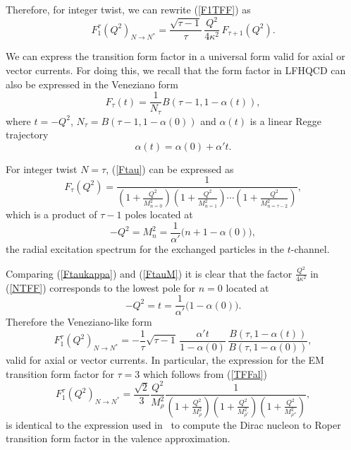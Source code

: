 \documentclass[12pt]{article}
\newcommand{\beq}{\begin{equation}}
\newcommand{\enq}{\end{equation}}
\newcommand{\req}[1]{(\ref{#1})}
\newcommand{\al}{\alpha}
\newcommand{\ka}{\kappa}
\newcommand{\ta}{\tau}
\begin{document}
Therefore, for integer twist, we can rewrite \req{F1TFF} as
\beq \label{NTFF}
F_1^\tau(Q^2)_{N \to N^*}  = \frac{\sqrt{\ta -1}}{\ta} \, \frac{Q^2}{4 \ka^2} \, F_{\ta+1}(Q^2).
\enq



We can express the transition form factor in a universal form valid for axial or vector currents. For doing this, we recall that the form factor in LFHQCD can also be expressed in the Veneziano form~\cite{deTeramond:2018ecg} 
\beq \label{FBtau} \label{Ftau}
F_\tau(t) = \frac{1}{N_\tau} B\left(\tau-1, 1 - \al(t) \right),  
\enq
where $t = - Q^2$, $N_\tau =  B\left(\ta-1, 1 - \al(0) \right)$  and  $\al(t)$ is a linear Regge trajectory 
\beq \label{RT}
\al(t) = \al(0) + \al'  t.
\enq


For integer twist $N = \tau$, \req{Ftau} can be expressed as~\cite{Sufian:2018cpj}
\beq \label{FtauM}
F_{\tau}( Q^2) = \frac{1}{\left(1 + \frac{Q^2}{M^2_{n=0}}\right) \left(1 + \frac{Q^2}{M^2_{n=1}} \right) \cdots \left(1 + \frac{Q^2}{M^2_{n =\tau - 2}} \right)},
\enq
which is  a product of $\tau -1$ poles located at 
\beq  \label{M2RT}
 - Q^2 = M^2_n = \frac{1}{\al'}\bigg(n + 1 - \al(0)\bigg),
\enq
the radial excitation spectrum for the exchanged particles in the $t$-channel.

Comparing  \req{Ftaukappa}  and  \req{FtauM} it is clear that the factor $\frac{Q^2}{4 \ka^2}$ in \req{NTFF} corresponds to the lowest pole for $n = 0$ located at 
\beq  \label{M2RT}
 - Q^2 = t = \frac{1}{\al'}\bigg(1 - \al(0)\bigg).
\enq
Therefore the Veneziano-like form
\beq \label{TFFal}
F^\tau_1(Q^2)_{N \to N^*}  = - \frac{1}{\ta} \sqrt{\tau - 1} \,  \frac{\al'  t}{1 - \al(0)} \, \frac{B(\ta, 1 - \al(t))}{B(\ta,1- \al(0))},
\enq
valid for axial or vector currents. In particular, the expression for the EM transition form factor  for $\tau = 3$ which follows from \req{TFFal}
\beq
F^\tau_1(Q^2)_{N \to N^*} = \frac{\sqrt{2}}{3}  \frac{Q^2}{M_\rho^2} \frac{1}{\left(1 + \frac{Q^2}{M^2_\rho}\right) \left(1 + \frac{Q^2}{M^2_{\rho'}} \right) \left(1 + \frac{Q^2}{M^2_{\rho''}} \right)},
\enq
is identical to the expression used in~\cite{deTeramond:2011qp} to compute the Dirac nucleon to Roper transition form factor in the valence approximation.
\end{document}
